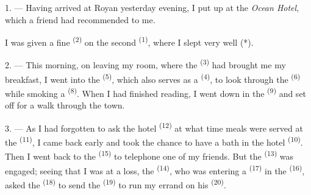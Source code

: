 %


\VUsaut{3.0mm}
\VUsaut{1.6mm}
\VUsaut{2.0mm}
\VUsaut{3.4mm}

1. --- Having arrived at Royan yesterday evening, I put up at the
\textit{Ocean Hotel}, which a friend had recommended to me.

I was given a fine  \textsuperscript{(2)} on the second 
\textsuperscript{(1)}, where I slept very well (*).

2. --- This morning, on leaving my room, where the 
\textsuperscript{(3)} had brought me my breakfast, I went into the
 \textsuperscript{(5)}, which also serves as a
 \textsuperscript{(4)}, to look through the 
\textsuperscript{(6)} while smoking a  \textsuperscript{(8)}. When I had
finished reading, I went down in the  \textsuperscript{(9)} and set off
for a walk through the town.

3. --- As I had forgotten to ask the hotel  \textsuperscript{(12)} at
what time meals were served at the  \textsuperscript{(11)}, I came
back early and took the chance to have a bath in the hotel
 \textsuperscript{(10)}. Then I went back to the 
\textsuperscript{(15)} to telephone one of my friends. But the 
\textsuperscript{(13)} was engaged; seeing that I was at a loss, the
 \textsuperscript{(14)}, who was entering a  \textsuperscript{(17)} in
the  \textsuperscript{(16)}, asked the 
\textsuperscript{(18)} to send the  \textsuperscript{(19)} to run my errand on
his  \textsuperscript{(20)}.

